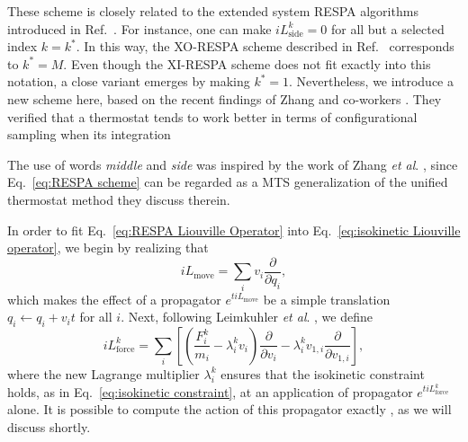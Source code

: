 \documentclass[
    journal=jctcce,
    layout=twocolumn
]{achemso}
\newcommand{\diff}[2]{\frac{\partial #2}{\partial #1}} %
\newcommand{\dof}{i}   %
\newcommand{\Liu}{i\!L}
\begin{document}
These scheme is closely related to the extended system RESPA algorithms introduced in Ref.~.
For instance, one can make $\Liu_\mathrm{side}^k = 0$ for all but a selected index $k = k^\ast$.
In this way, the XO-RESPA scheme described in Ref.~ corresponds to $k^\ast = M$.
Even though the XI-RESPA scheme \cite{Leimkuhler_2013} does not fit exactly into this notation, a close variant emerges by making $k^\ast = 1$.
Nevertheless, we introduce a new scheme here, based on the recent findings of Zhang and co-workers \cite{Zhang_2017}.
They verified that a thermostat tends to work better in terms of configurational sampling when its integration 


The use of words \textit{middle} and \textit{side} was inspired by the work of Zhang \textit{et al}. \cite{Zhang_2017}, since Eq.~\eqref{eq:RESPA scheme} can be regarded as a MTS generalization of the unified thermostat method they discuss therein.

In order to fit Eq.~\eqref{eq:RESPA Liouville Operator} into Eq.~\eqref{eq:isokinetic Liouville operator}, we begin by realizing that
\begin{equation}
\Liu_\mathrm{move} = \sum_\dof v_\dof \diff{q_\dof}{},
\end{equation}
which makes the effect of a propagator $e^{t \Liu_\mathrm{move}}$ be a simple translation $q_\dof \leftarrow q_\dof + v_\dof t$ for all $\dof$.
Next, following Leimkuhler \textit{et al}. \cite{Leimkuhler_2013}, we define
\begin{equation}
\label{eq:force-dependent Liouville operator}
\Liu_\mathrm{force}^k = \sum_\dof \left[\left(\frac{F^k_\dof}{m_\dof} - \lambda^k_\dof v_\dof \right)\diff{v_\dof}{} - \lambda^k_\dof v_{1,\dof} \diff{v_{1,\dof}}{}\right],
\end{equation}
where the new Lagrange multiplier $\lambda^k_\dof$ ensures that the isokinetic constraint holds, as in Eq.~\eqref{eq:isokinetic constraint}, at an application of propagator $e^{t \Liu_\mathrm{force}^k}$ alone.
It is possible to compute the action of this propagator exactly \cite{Minary_2003, Leimkuhler_2013}, as we will discuss shortly.
\end{document}
